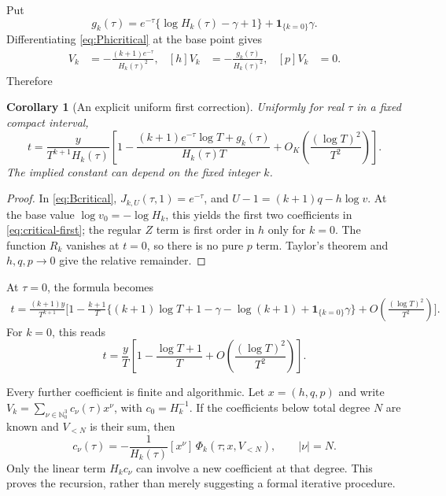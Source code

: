 \documentclass[11pt,a4paper]{article}
\numberwithin{equation}{section}
\newtheorem{corollary}[theorem]{Corollary}
\theoremstyle{definition}
\theoremstyle{remark}
\newcommand{\Nzero}{\mathbb N_0}
\begin{document}
Put
\begin{equation}
 g_k(\tau)=e^{-\tau}
 \{\log H_k(\tau)-\gamma+1\}
 +\mathbf1_{\{k=0\}}\gamma.
 \label{eq:gk}
\end{equation}
Differentiating \eqref{eq:Phicritical} at the base point gives
\begin{align}
 [q]V_k&=-\frac{(k+1)e^{-\tau}}{H_k(\tau)^2},
 &
 [h]V_k&=-\frac{g_k(\tau)}{H_k(\tau)^2},
 &
 [p]V_k&=0.
 \label{eq:critical-first}
\end{align}
Therefore
\begin{corollary}[An explicit uniform first correction]
\label{cor:firstcritical}
Uniformly for real \(\tau\) in a fixed compact interval,
\begin{equation}
 t=\frac{y}{T^{k+1}H_k(\tau)}
 \left[
 1-\frac{(k+1)e^{-\tau}\log T+g_k(\tau)}
          {H_k(\tau)T}
 +O_K\left(\frac{(\log T)^2}{T^2}\right)
 \right].
 \label{eq:critical-first-final}
\end{equation}
The implied constant can depend on the fixed integer \(k\).
\end{corollary}

\begin{proof}
In \eqref{eq:Bcritical}, \(J_{k,U}(\tau,1)=e^{-\tau}\), and
\(U-1=(k+1)q-h\log v\).
At the base value \(\log v_0=-\log H_k\), this yields the first two
coefficients in \eqref{eq:critical-first}; the regular \(Z\) term is
first order in \(h\) only for \(k=0\).
The function \(R_k\) vanishes at \(t=0\), so there is no pure \(p\) term.
Taylor's theorem and \(h,q,p\to0\) give the relative remainder.
\end{proof}

At \(\tau=0\), the formula becomes
\begin{align}
 t=\frac{(k+1)y}{T^{k+1}}
 \biggl[1-\frac{k+1}{T}
 \bigl\{(k+1)\log T+1-\gamma-\log(k+1)
       +\mathbf1_{\{k=0\}}\gamma\bigr\}
 +O\!\left(\frac{(\log T)^2}{T^2}\right)\biggr].
 \label{eq:critical-exact-resonance}
\end{align}
For \(k=0\), this reads
\[
 t=\frac yT\left[1-\frac{\log T+1}{T}
       +O\left(\frac{(\log T)^2}{T^2}\right)\right].
\]

Every further coefficient is finite and algorithmic.  Let \(x=(h,q,p)\)
and write \(V_k=\sum_{\nu\in\Nzero^3}c_\nu(\tau)x^\nu\), with
\(c_0=H_k^{-1}\).
If the coefficients below total degree \(N\) are known and \(V_{<N}\)
is their sum, then
\begin{equation}
 c_\nu(\tau)=
 -\frac1{H_k(\tau)}
 [x^\nu]\,\Phi_k(\tau;x,V_{<N}),
 \qquad |\nu|=N.
 \label{eq:critical-recursion}
\end{equation}
Only the linear term \(H_kc_\nu\) can involve a new coefficient at that
degree.  This proves the recursion, rather than merely suggesting a
formal iterative procedure.
\end{document}
